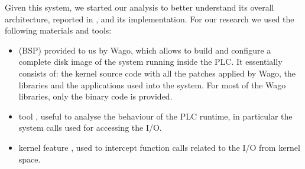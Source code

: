 Given this system, we started our analysis to better understand its overall architecture, reported in , and its implementation.
For our research we used the following materials and tools:
\begin{itemize}
	\item {} (BSP) \cite{wago_linux} provided to us by Wago, which allows to build and configure a complete disk image
	of the system running inside the PLC. It essentially consists of: the kernel source code with all the patches applied by Wago, the libraries and
	the applications used into the system. For most of the Wago libraries, only the binary code is provided.
	\item {} tool \cite{strace}, useful to analyse the behaviour of the PLC runtime, in particular the system calls used for accessing the I/O.
	\item {} kernel feature \cite{kprobes}, used to intercept function calls related to the I/O from kernel space.
\end{itemize}

